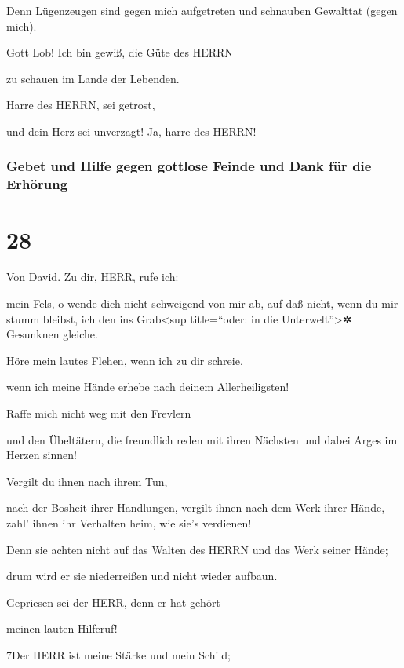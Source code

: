 Denn Lügenzeugen sind gegen mich aufgetreten und schnauben Gewalttat
(gegen mich).

Gott Lob! Ich bin gewiß, die Güte des HERRN

zu schauen im Lande der Lebenden.

Harre des HERRN, sei getrost,

und dein Herz sei unverzagt! Ja, harre des HERRN!

\hypertarget{gebet-und-hilfe-gegen-gottlose-feinde-und-dank-fuxfcr-die-erhuxf6rung}{%
\subsubsection{Gebet und Hilfe gegen gottlose Feinde und Dank für die
Erhörung}\label{gebet-und-hilfe-gegen-gottlose-feinde-und-dank-fuxfcr-die-erhuxf6rung}}

\hypertarget{section-27}{%
\section{28}\label{section-27}}

Von David. Zu dir, HERR, rufe ich:

mein Fels, o wende dich nicht schweigend von mir ab, auf daß nicht, wenn
du mir stumm bleibst, ich den ins Grab\textless sup title=``oder: in die
Unterwelt''\textgreater✲ Gesunknen gleiche.

Höre mein lautes Flehen, wenn ich zu dir schreie,

wenn ich meine Hände erhebe nach deinem Allerheiligsten!

Raffe mich nicht weg mit den Frevlern

und den Übeltätern, die freundlich reden mit ihren Nächsten und dabei
Arges im Herzen sinnen!

Vergilt du ihnen nach ihrem Tun,

nach der Bosheit ihrer Handlungen, vergilt ihnen nach dem Werk ihrer
Hände, zahl' ihnen ihr Verhalten heim, wie sie's verdienen!

Denn sie achten nicht auf das Walten des HERRN und das
Werk seiner Hände;

drum wird er sie niederreißen und nicht wieder aufbaun.

Gepriesen sei der HERR, denn er hat gehört

meinen lauten Hilferuf!

7Der HERR ist meine Stärke und mein Schild;

